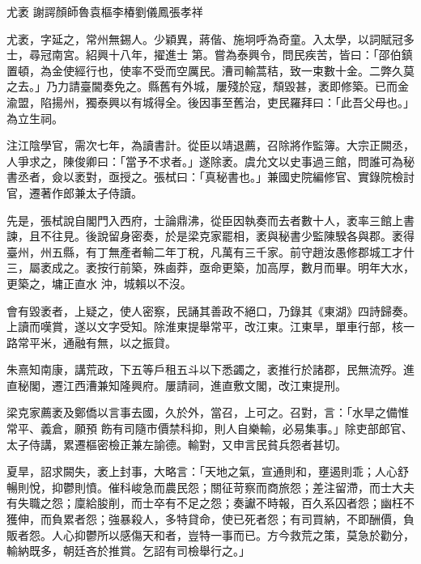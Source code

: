 
\begin{pinyinscope}

 尤袤
 謝諤顏師魯袁樞李椿劉儀鳳張孝祥



 尤袤，字延之，常州無錫人。少穎異，蔣偕、施坰呼為奇童。入太學，以詞賦冠多士，尋冠南宮。紹興十八年，擢進士
 第。嘗為泰興令，問民疾苦，皆曰：「邵伯鎮置頓，為金使經行也，使率不受而空厲民。漕司輸蒿秸，致一束數十金。二弊久莫之去。」乃力請臺閫奏免之。縣舊有外城，屢殘於寇，頹毀甚，袤即修築。已而金渝盟，陷揚州，獨泰興以有城得全。後因事至舊治，吏民羅拜曰：「此吾父母也。」為立生祠。



 注江陰學官，需次七年，為讀書計。從臣以靖退薦，召除將作監簿。大宗正闕丞，人爭求之，陳俊卿曰：「當予不求者。」遂除袤。虞允文以史事過三館，問誰可為秘
 書丞者，僉以袤對，亟授之。張栻曰：「真秘書也。」兼國史院編修官、實錄院檢討官，遷著作郎兼太子侍讀。



 先是，張栻說自閣門入西府，士論鼎沸，從臣因執奏而去者數十人，袤率三館上書諫，且不往見。後說留身密奏，於是梁克家罷相，袤與秘書少監陳騤各與郡。袤得臺州，州五縣，有丁無產者輸二年丁稅，凡萬有三千家。前守趙汝愚修郡城工才什三，屬袤成之。袤按行前築，殊鹵莽，亟命更築，加高厚，數月而畢。明年大水，更築之，墉正直水
 沖，城賴以不沒。



 會有毀袤者，上疑之，使人密察，民誦其善政不絕口，乃錄其《東湖》四詩歸奏。上讀而嘆賞，遂以文字受知。除淮東提舉常平，改江東。江東旱，單車行部，核一路常平米，通融有無，以之振貸。



 朱熹知南康，講荒政，下五等戶租五斗以下悉蠲之，袤推行於諸郡，民無流殍。進直秘閣，遷江西漕兼知隆興府。屢請祠，進直敷文閣，改江東提刑。



 梁克家薦袤及鄭僑以言事去國，久於外，當召，上可之。召對，言：「水旱之備惟常平、義倉，願預
 飭有司隨市價禁科抑，則人自樂輸，必易集事。」除吏部郎官、太子侍講，累遷樞密檢正兼左諭德。輸對，又申言民貧兵怨者甚切。



 夏旱，詔求闕失，袤上封事，大略言：「天地之氣，宣通則和，壅遏則乖；人心舒暢則悅，抑鬱則憤。催科峻急而農民怨；關征苛察而商旅怨；差注留滯，而士大夫有失職之怨；廩給朘削，而士卒有不足之怨；奏讞不時報，百久系囚者怨；幽枉不獲伸，而負累者怨；強暴殺人，多特貸命，使已死者怨；有司買納，不即酬價，負
 販者怨。人心抑鬱所以感傷天和者，豈特一事而已。方今救荒之策，莫急於勸分，輸納既多，朝廷吝於推賞。乞詔有司檢舉行之。」




\end{pinyinscope}
